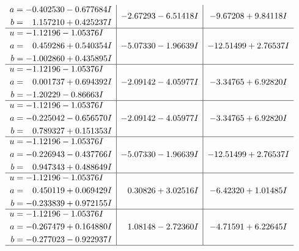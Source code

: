 \documentclass[1p]{elsarticle_modified}
\theoremstyle{definition}
\begin{document}
$$\begin{array}{c|c|c}
\begin{aligned}
a &= -0.402530 - 0.677684 I \\
b &= \phantom{-}1.157210 + 0.425237 I\end{aligned}
 & -2.67293 - 6.51418 I & -9.67208 + 9.84118 I \\ \hline\begin{aligned}
u &= -1.12196 - 1.05376 I \\
a &= \phantom{-}0.459286 + 0.540354 I \\
b &= -1.002860 + 0.435895 I\end{aligned}
 & -5.07330 - 1.96639 I & -12.51499 + 2.76537 I \\ \hline\begin{aligned}
u &= -1.12196 - 1.05376 I \\
a &= \phantom{-}0.001737 + 0.694392 I \\
b &= -1.20229 - 0.86663 I\end{aligned}
 & -2.09142 - 4.05977 I & -3.34765 + 6.92820 I \\ \hline\begin{aligned}
u &= -1.12196 - 1.05376 I \\
a &= -0.225042 - 0.656570 I \\
b &= \phantom{-}0.789327 + 0.151353 I\end{aligned}
 & -2.09142 - 4.05977 I & -3.34765 + 6.92820 I \\ \hline\begin{aligned}
u &= -1.12196 - 1.05376 I \\
a &= -0.226943 - 0.437766 I \\
b &= \phantom{-}0.947343 + 0.488649 I\end{aligned}
 & -5.07330 - 1.96639 I & -12.51499 + 2.76537 I \\ \hline\begin{aligned}
u &= -1.12196 - 1.05376 I \\
a &= \phantom{-}0.450119 + 0.069429 I \\
b &= -0.233839 + 0.972155 I\end{aligned}
 & \phantom{-}0.30826 + 3.02516 I & -6.42320 + 1.01485 I \\ \hline\begin{aligned}
u &= -1.12196 - 1.05376 I \\
a &= -0.267479 + 0.164880 I \\
b &= -0.277023 - 0.922937 I\end{aligned}
 & \phantom{-}1.08148 - 2.72360 I & -4.71591 + 6.22645 I\\
 \hline 
 \end{array}$$\newpage$$\begin{array}{c|c|c}  

\end{array}$$
\end{document}
